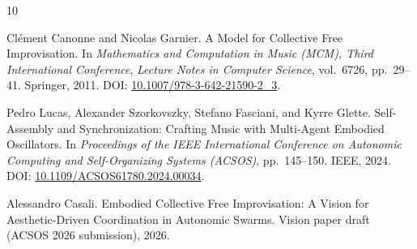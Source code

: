 \documentclass[11pt]{article}
\begin{document}
\begin{thebibliography}{10}

Cl{\'e}ment Canonne and Nicolas Garnier.
\newblock A Model for Collective Free Improvisation.
\newblock In \emph{Mathematics and Computation in Music (MCM), Third International Conference},
  \emph{Lecture Notes in Computer Science}, vol.~6726, pp.~29--41. Springer, 2011.
\newblock DOI: \href{https://doi.org/10.1007/978-3-642-21590-2_3}{10.1007/978-3-642-21590-2\_3}.

Pedro Lucas, Alexander Szorkovszky, Stefano Fasciani, and Kyrre Glette.
\newblock Self-Assembly and Synchronization: Crafting Music with Multi-Agent Embodied Oscillators.
\newblock In \emph{Proceedings of the IEEE International Conference on Autonomic Computing and Self-Organizing Systems (ACSOS)},
  pp.~145--150. IEEE, 2024.
\newblock DOI: \href{https://doi.org/10.1109/ACSOS61780.2024.00034}{10.1109/ACSOS61780.2024.00034}.

Alessandro Casali.
\newblock Embodied Collective Free Improvisation: A Vision for Aesthetic-Driven Coordination in Autonomic Swarms.
\newblock Vision paper draft (ACSOS 2026 submission), 2026.

\end{thebibliography}
\end{document}
